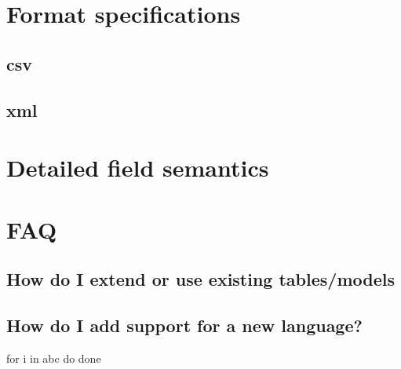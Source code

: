     \section{Format specifications}

        \subsection{csv}

        \subsection{xml}

    \section{Detailed field semantics}

    \section{FAQ}
        \subsection{How do I extend or use existing tables/models}

        \subsection{How do I add support for a new language?}

\begin{code}
for i in abc
do
done
\end{code}




